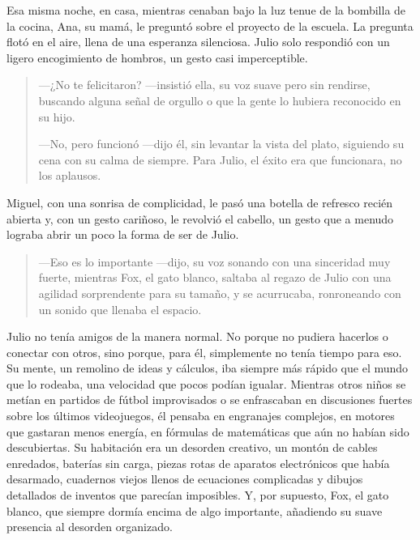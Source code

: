 \documentclass[a4paper,12pt]{book}
\begin{document}
Esa misma noche, en casa, mientras cenaban bajo la luz tenue de la bombilla de la cocina, Ana, su mamá, le preguntó sobre el proyecto de la escuela. La pregunta flotó en el aire, llena de una esperanza silenciosa. Julio solo respondió con un ligero encogimiento de hombros, un gesto casi imperceptible.

\begin{quote}
    —¿No te felicitaron? —insistió ella, su voz suave pero sin rendirse, buscando alguna señal de orgullo o que la gente lo hubiera reconocido en su hijo.

    —No, pero funcionó —dijo él, sin levantar la vista del plato, siguiendo su cena con su calma de siempre. Para Julio, el éxito era que funcionara, no los aplausos.
\end{quote}

Miguel, con una sonrisa de complicidad, le pasó una botella de refresco recién abierta y, con un gesto cariñoso, le revolvió el cabello, un gesto que a menudo lograba abrir un poco la forma de ser de Julio.

\begin{quote}
    —Eso es lo importante —dijo, su voz sonando con una sinceridad muy fuerte, mientras Fox, el gato blanco, saltaba al regazo de Julio con una agilidad sorprendente para su tamaño, y se acurrucaba, ronroneando con un sonido que llenaba el espacio.
\end{quote}

Julio no tenía amigos de la manera normal. No porque no pudiera hacerlos o conectar con otros, sino porque, para él, simplemente no tenía tiempo para eso. Su mente, un remolino de ideas y cálculos, iba siempre más rápido que el mundo que lo rodeaba, una velocidad que pocos podían igualar. Mientras otros niños se metían en partidos de fútbol improvisados o se enfrascaban en discusiones fuertes sobre los últimos videojuegos, él pensaba en engranajes complejos, en motores que gastaran menos energía, en fórmulas de matemáticas que aún no habían sido descubiertas. Su habitación era un desorden creativo, un montón de cables enredados, baterías sin carga, piezas rotas de aparatos electrónicos que había desarmado, cuadernos viejos llenos de ecuaciones complicadas y dibujos detallados de inventos que parecían imposibles. Y, por supuesto, Fox, el gato blanco, que siempre dormía encima de algo importante, añadiendo su suave presencia al desorden organizado.
\end{document}

